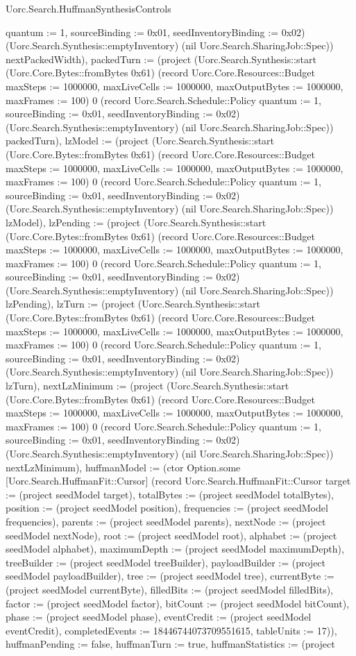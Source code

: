 \begin{lexlean}{Uorc.Search.HuffmanSynthesisControls}
\begin{semanticmodule}
{{quantum := 1, sourceBinding := 0x01, seedInventoryBinding := 0x02}) (Uorc.Search.Synthesis::emptyInventory) (nil Uorc.Search.SharingJob::Spec)) nextPackedWidth), packedTurn := (project (Uorc.Search.Synthesis::start (Uorc.Core.Bytes::fromBytes 0x61) (record Uorc.Core.Resources::Budget {maxSteps := 1000000, maxLiveCells := 1000000, maxOutputBytes := 1000000, maxFrames := 100}) 0 (record Uorc.Search.Schedule::Policy {quantum := 1, sourceBinding := 0x01, seedInventoryBinding := 0x02}) (Uorc.Search.Synthesis::emptyInventory) (nil Uorc.Search.SharingJob::Spec)) packedTurn), lzModel := (project (Uorc.Search.Synthesis::start (Uorc.Core.Bytes::fromBytes 0x61) (record Uorc.Core.Resources::Budget {maxSteps := 1000000, maxLiveCells := 1000000, maxOutputBytes := 1000000, maxFrames := 100}) 0 (record Uorc.Search.Schedule::Policy {quantum := 1, sourceBinding := 0x01, seedInventoryBinding := 0x02}) (Uorc.Search.Synthesis::emptyInventory) (nil Uorc.Search.SharingJob::Spec)) lzModel), lzPending := (project (Uorc.Search.Synthesis::start (Uorc.Core.Bytes::fromBytes 0x61) (record Uorc.Core.Resources::Budget {maxSteps := 1000000, maxLiveCells := 1000000, maxOutputBytes := 1000000, maxFrames := 100}) 0 (record Uorc.Search.Schedule::Policy {quantum := 1, sourceBinding := 0x01, seedInventoryBinding := 0x02}) (Uorc.Search.Synthesis::emptyInventory) (nil Uorc.Search.SharingJob::Spec)) lzPending), lzTurn := (project (Uorc.Search.Synthesis::start (Uorc.Core.Bytes::fromBytes 0x61) (record Uorc.Core.Resources::Budget {maxSteps := 1000000, maxLiveCells := 1000000, maxOutputBytes := 1000000, maxFrames := 100}) 0 (record Uorc.Search.Schedule::Policy {quantum := 1, sourceBinding := 0x01, seedInventoryBinding := 0x02}) (Uorc.Search.Synthesis::emptyInventory) (nil Uorc.Search.SharingJob::Spec)) lzTurn), nextLzMinimum := (project (Uorc.Search.Synthesis::start (Uorc.Core.Bytes::fromBytes 0x61) (record Uorc.Core.Resources::Budget {maxSteps := 1000000, maxLiveCells := 1000000, maxOutputBytes := 1000000, maxFrames := 100}) 0 (record Uorc.Search.Schedule::Policy {quantum := 1, sourceBinding := 0x01, seedInventoryBinding := 0x02}) (Uorc.Search.Synthesis::emptyInventory) (nil Uorc.Search.SharingJob::Spec)) nextLzMinimum), huffmanModel := (ctor Option.some [Uorc.Search.HuffmanFit::Cursor] (record Uorc.Search.HuffmanFit::Cursor {target := (project seedModel target), totalBytes := (project seedModel totalBytes), position := (project seedModel position), frequencies := (project seedModel frequencies), parents := (project seedModel parents), nextNode := (project seedModel nextNode), root := (project seedModel root), alphabet := (project seedModel alphabet), maximumDepth := (project seedModel maximumDepth), treeBuilder := (project seedModel treeBuilder), payloadBuilder := (project seedModel payloadBuilder), tree := (project seedModel tree), currentByte := (project seedModel currentByte), filledBits := (project seedModel filledBits), factor := (project seedModel factor), bitCount := (project seedModel bitCount), phase := (project seedModel phase), eventCredit := (project seedModel eventCredit), completedEvents := 18446744073709551615, tableUnits := 17})), huffmanPending := false, huffmanTurn := true, huffmanStatistics := (project }
\end{semanticmodule}
\end{lexlean}
